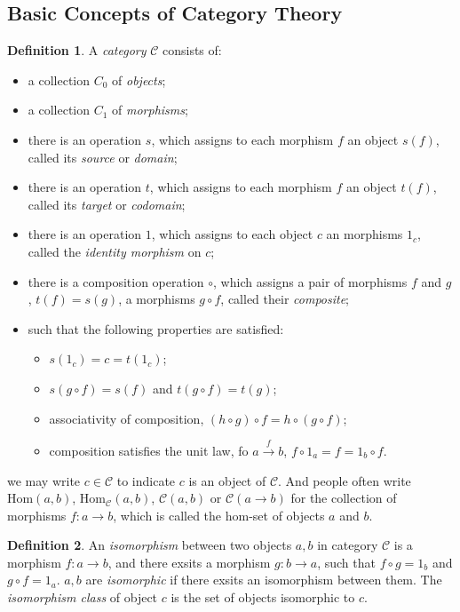 \documentclass[a4paper,11pt]{article}
\theoremstyle{definition}
\newtheorem{definition}{Definition}[section]
\begin{document}
\subsection{Basic Concepts of Category Theory}
\begin{definition}
    A \textit{category} $\mathcal{C}$ consists of:\\
    \begin{itemize}
        \item a collection $C_0$ of \textit{objects};
        \item a collection $C_1$ of \textit{morphisms};
        \item there is an operation $s$, which assigns to each morphism $f$ an object $s(f)$, called its \textit{source} or \textit{domain};
        \item there is an operation $t$, which assigns to each morphism $f$ an object $t(f)$, called its \textit{target} or \textit{codomain};
        \item there is an operation $1$, which assigns to each object $c$ an morphisms $1_c$, called the \textit{identity morphism} on $c$;
        \item there is a composition operation $\circ$, which assigns a pair of morphisms $f$ and $g$, $t(f)=s(g)$, a morphisms $g\circ f$, called their \textit{composite};
        \item such that the following properties are satisfied:
        \begin{itemize}
            \item $s(1_c)=c=t(1_c)$;
            \item $s(g\circ f)=s(f)$ and $t(g \circ f)=t(g)$;
            \item associativity of composition, $(h\circ g)\circ f=h\circ(g\circ f)$;
            \item composition satisfies the unit law, fo $a\xrightarrow{f}b$, $f\circ 1_a=f=1_b\circ f$.
        \end{itemize}
    \end{itemize}
    we may write $c\in \mathcal{C}$ to indicate $c$ is an object of $\mathcal{C}$. And people often write $\mathrm{Hom}(a,b)$, $\mathrm{Hom}_{\mathcal{C}}(a,b)$, $\mathcal{C}(a,b)$ or $\mathcal{C}(a\to b)$
    for the collection of morphisms $f:a\to b$, which is called the hom-set of objects $a$ and $b$.
\end{definition}

\begin{definition}
    An \textit{isomorphism} between two objects $a,b$ in category $\mathcal{C}$ is a morphism $f:a\to b$, 
    and there exsits a morphism $g:b\to a$, such that $f\circ g=1_b$ and $g\circ f=1_a$. 
    $a,b$ are \textit{isomorphic} if there exsits an isomorphism between them. The \textit{isomorphism class} of object $c$ is the set of objects isomorphic to $c$. 
\end{definition}
\end{document}
